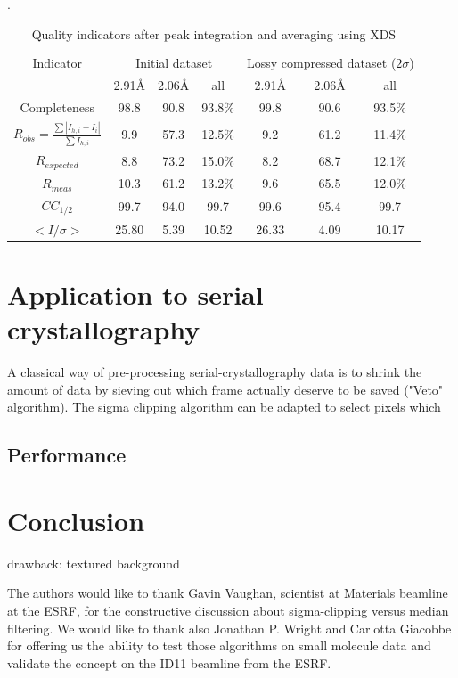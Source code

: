 \documentclass[preprint]{iucr}              %
\begin{document}
\begin{table}[1]
\begin{center}
\label{xds_summary}
\caption{Quality indicators after peak integration and averaging using XDS\cite{xds}}.
\begin{tabular}{|c|c c c|c c c|} 
\hline
Indicator & \multicolumn{3}{c|}{Initial dataset} & \multicolumn{3}{c|}{Lossy compressed dataset ($2\sigma$)} \\ 
          & 2.91\AA & 2.06\AA & all & 2.91\AA & 2.06\AA & all \\
\hline
Completeness                                        & 98.8& 90.8 & 93.8\% & 99.8& 90.6 & 93.5\% \\ 
$R_{obs}=\frac{\sum |I_{h,i}-I_{i}|}{\sum I_{h,i}}$ & 9.9 & 57.3& 12.5\% & 9.2 & 61.2&  11.4\%\\ 
$R_{expected}$                                      & 8.8 & 73.2& 15.0\% & 8.2 & 68.7 &  12.1\%\\
$R_{meas}$ \cite{Rmeas}  &10.3 &61.2& 13.2\% & 9.6 & 65.5 & 12.0\%\\
$CC_{1/2}$ \cite{cc1/2}  & 99.7 &94.0 & 99.7   & 99.6 & 95.4 & 99.7  \\
$<I/\sigma>$               & 25.80 & 5.39 & 10.52  & 26.33& 4.09 & 10.17 \\
\hline
\end{tabular}
\end{center}
\end{table}


\section{Application to serial crystallography}
A classical way of pre-processing serial-crystallography data is to shrink the amount of data by sieving out which frame actually deserve to be saved ("Veto" algorithm).
The sigma clipping algorithm can be adapted to select pixels which   
\subsection{Performance}
\section{Conclusion}
drawback: textured background



The authors would like to thank Gavin Vaughan, scientist at Materials beamline at the ESRF,  for the constructive discussion about sigma-clipping versus median filtering. 
We would like to thank also Jonathan P. Wright and Carlotta Giacobbe for offering us the ability to test those algorithms on small molecule data and validate the concept on the ID11 beamline from the ESRF.




\end{document}
